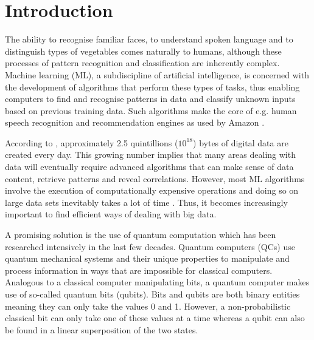 \chapter{Introduction}\label{sec:introduction}

The ability to recognise familiar faces, to understand spoken language and to distinguish types of vegetables comes naturally to humans, although these processes of pattern recognition and classification are inherently complex. Machine learning (ML), a subdiscipline of artificial intelligence, is concerned with the development of algorithms that perform these types of tasks, thus enabling computers to find and recognise patterns in data and classify unknown inputs based on previous training data. Such algorithms make the core of e.g. human speech recognition and recommendation engines as used by Amazon \cite{graves2013speech,linden2003amazon}.

According to , approximately 2.5 quintillions (${10}^{18}$) bytes of digital data are created every day. This growing number implies that many areas dealing with data will eventually require advanced algorithms that can make sense of data content, retrieve patterns and reveal correlations. However, most ML algorithms involve the execution of computationally expensive operations and doing so on large data sets inevitably takes a lot of time \cite{bekkerman2011scaling}. Thus, it becomes increasingly important to find efficient ways of dealing with big data.

A promising solution is the use of quantum computation which has been researched intensively in the last few decades. Quantum computers (QCs) use quantum mechanical systems and their unique properties to manipulate and process information in ways that are impossible for classical computers. Analogous to a classical computer manipulating bits, a quantum computer makes use of so-called quantum bits (qubits). Bits and qubits are both binary entities meaning they can only take the values 0 and 1. However, a non-probabilistic classical bit can only take one of these values at a time whereas a qubit can also be found in a linear superposition of the two states.



